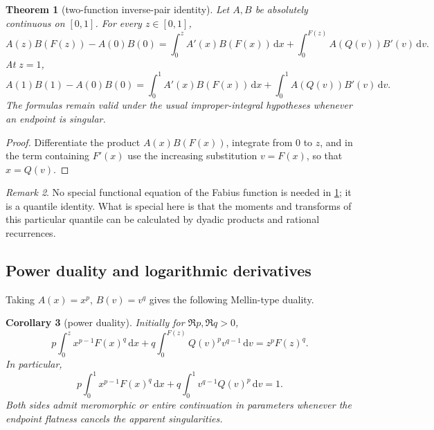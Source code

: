 \documentclass[11pt,oneside]{article}
\newtheorem{theorem}{Theorem}[section]
\newtheorem{corollary}[theorem]{Corollary}
\theoremstyle{definition}
\theoremstyle{remark}
\newtheorem{remark}[theorem]{Remark}
\newcommand{\F}{F}
\newcommand{\Q}{Q}
\newcommand{\dd}{\,\mathrm d}
\newcommand{\1}{\mathbf 1}
\begin{document}
\begin{theorem}[two-function inverse-pair identity]\label{p10:thm:AB}
Let \(A,B\) be absolutely continuous on \([0,1]\).  For every \(z\in[0,1]\),
\begin{equation}\label{p10:eq:AB-incomplete}
 A(z)B(\F(z))-A(0)B(0)
 =\int_0^z A'(x)B(\F(x))\dd x
 +\int_0^{\F(z)}A(\Q(v))B'(v)\dd v.
\end{equation}
At \(z=1\),
\begin{equation}\label{p10:eq:AB-complete}
 A(1)B(1)-A(0)B(0)
 =\int_0^1A'(x)B(\F(x))\dd x
 +\int_0^1A(\Q(v))B'(v)\dd v.
\end{equation}
The formulas remain valid under the usual improper-integral hypotheses whenever an
endpoint is singular.
\end{theorem}

\begin{proof}
Differentiate the product \(A(x)B(\F(x))\), integrate from \(0\) to \(z\), and in
the term containing \(\F'(x)\) use the increasing substitution \(v=\F(x)\),
so that \(x=\Q(v)\).
\end{proof}

\begin{remark}
No special functional equation of the Fabius function is needed in
\cref{p10:thm:AB}; it is a quantile identity.  What is special here is that the moments and
transforms of this particular quantile can be calculated by dyadic products and rational
recurrences.
\end{remark}

\subsection{Power duality and logarithmic derivatives}

Taking \(A(x)=x^p\), \(B(v)=v^q\) gives the following Mellin-type duality.

\begin{corollary}[power duality]\label{p10:cor:power-duality}
Initially for \(\Re p,\Re q>0\),
\begin{equation}\label{p10:eq:power-incomplete}
 p\int_0^z x^{p-1}\F(x)^q\dd x
 +q\int_0^{\F(z)}\Q(v)^p v^{q-1}\dd v
 =z^p\F(z)^q.
\end{equation}
In particular,
\begin{equation}\label{p10:eq:power-complete}
 p\int_0^1x^{p-1}\F(x)^q\dd x
 +q\int_0^1v^{q-1}\Q(v)^p\dd v=1.
\end{equation}
Both sides admit meromorphic or entire continuation in parameters whenever the endpoint
flatness cancels the apparent singularities.
\end{corollary}
\end{document}
